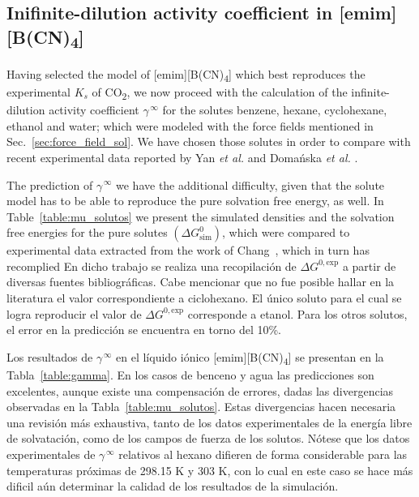 \documentclass[3p,twocolumn]{elsarticle}
\begin{document}
\subsection{Inifinite-dilution activity coefficient in [emim] [B(CN)\textsubscript{4}]}
\label{sec:act_results}

Having selected the model of [emim][B(CN)\textsubscript{4}] which best reproduces the experimental $K_s$ of CO\textsubscript{2}, we now proceed with the calculation of the infinite-dilution activity coefficient $\gamma^{\, \infty}$ for the solutes benzene, hexane, cyclohexane, ethanol and water; which were modeled with the force fields mentioned in Sec.~\ref{sec:force_field_sol}. We have chosen those solutes in order to compare with recent experimental data reported by Yan \textit{et al.}\cite{Yan_2010} and Doma{\'{n}}ska \textit{et al.} \cite{Doma_ska_2011}.

The prediction of $\gamma^{\, \infty}$ we have the additional difficulty, given that the solute model has to be able to reproduce the pure solvation free energy, as well. In Table~\ref{table:mu_solutos} we present the simulated densities and the solvation free energies for the pure solutes $(\Delta G^{0}_{\text{sim}})$, which were compared to experimental data extracted from the work of Chang~\cite{Chang_2009}, which in turn has recomplied  En dicho trabajo se realiza una recopilación de $\Delta G^{0,\text{exp}}$ a partir de diversas fuentes bibliográficas.  Cabe mencionar que no fue posible hallar en la literatura el valor correspondiente a ciclohexano. El único soluto para el cual se logra reproducir el valor de $\Delta G^{0,\text{exp}}$ corresponde a etanol. Para los otros solutos, el error en la predicción se encuentra en torno del 10\%.

Los resultados de $\gamma^{\, \infty}$ en el líquido iónico [emim][B(CN)\textsubscript{4}] se presentan en la Tabla~\ref{table:gamma}. En los casos de benceno y agua las predicciones son excelentes, aunque existe una compensación de errores, dadas las divergencias observadas en la Tabla~\ref{table:mu_solutos}. Estas divergencias hacen necesaria una revisión más exhaustiva, tanto de los datos experimentales de la energía libre de solvatación, como de los campos de fuerza de los solutos. Nótese que los datos experimentales de $\gamma^{\, \infty}$ relativos al hexano difieren de forma considerable para las temperaturas próximas de 298.15 K y 303 K, con lo cual en este caso se hace más dificil aún determinar la calidad de los resultados de la simulación.
\end{document}

